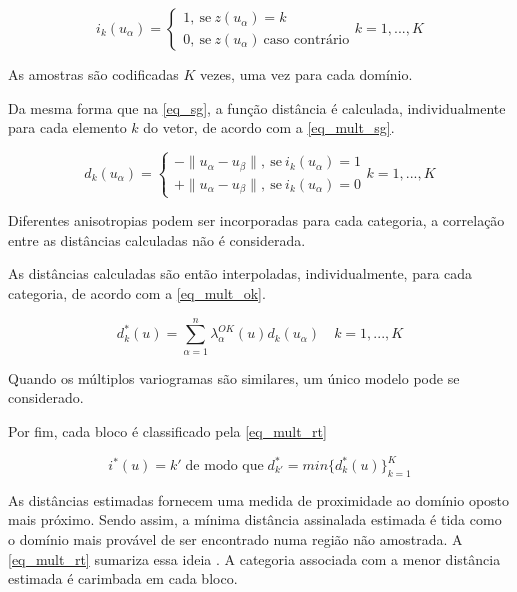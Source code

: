 \begin{equation}
	i_k(u_\alpha)=\begin{cases}
	1,\:\textrm{se}\:z(u_\alpha)=k\\
    0,\:\textrm{se}\:z(u_\alpha)\:\textrm{caso contrário}\end{cases} k=1,...,K
    \label{eq_mult_ind}
\end{equation}

As amostras são codificadas $K$ vezes, uma vez para cada domínio.

Da mesma forma que na \autoref{eq_sg}, a função distância é calculada, individualmente para cada elemento $k$ do vetor, de acordo com a \autoref{eq_mult_sg}.

\begin{equation}
	d_k(u_\alpha)=\begin{cases}
	-\parallel u_\alpha-u_\beta\parallel,\:\textrm{se}\:i_k(u_\alpha)=1\\
	+\parallel u_\alpha-u_\beta\parallel,\:\textrm{se}\:i_k(u_\alpha)=0\end{cases} k=1,...,K
    \label{eq_mult_sg}
\end{equation}

Diferentes anisotropias podem ser incorporadas para cada categoria, a correlação entre as distâncias calculadas não é considerada.

As distâncias calculadas são então interpoladas, individualmente, para cada categoria, de acordo com a \autoref{eq_mult_ok}.

\begin{equation}
	d_k^*(u)=\sum\limits_{\alpha=1}^n \lambda_\alpha^{OK}(u)d_k(u_\alpha)\quad k=1,...,K
    \label{eq_mult_ok}
\end{equation}

Quando os múltiplos variogramas são similares, um único modelo pode se considerado.

Por fim, cada bloco é  classificado pela \autoref{eq_mult_rt}

\begin{equation}
	i^*(u)=k'\;\text{de modo que}\;d_{k'}^*=min\{d_k^*(u)\}_{k=1}^K
    \label{eq_mult_rt}
\end{equation}

As distâncias estimadas fornecem uma medida de proximidade ao domínio oposto mais próximo. Sendo assim, a mínima distância assinalada estimada é tida como o domínio mais provável de ser encontrado numa região não amostrada. A \autoref{eq_mult_rt} sumariza essa ideia \cite{maureira}. A categoria associada com a menor distância estimada é carimbada em cada bloco.


